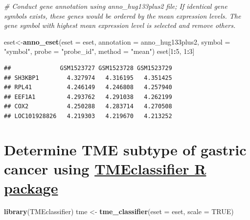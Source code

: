 \documentclass[
  12pt,
]{book}
\newenvironment{Shaded}{\begin{snugshade}}{\end{snugshade}}
\newcommand{\AttributeTok}[1]{\textcolor[rgb]{0.13,0.29,0.53}{#1}}
\newcommand{\CommentTok}[1]{\textcolor[rgb]{0.56,0.35,0.01}{\textit{#1}}}
\newcommand{\ConstantTok}[1]{\textcolor[rgb]{0.56,0.35,0.01}{#1}}
\newcommand{\DecValTok}[1]{\textcolor[rgb]{0.00,0.00,0.81}{#1}}
\newcommand{\FunctionTok}[1]{\textcolor[rgb]{0.13,0.29,0.53}{\textbf{#1}}}
\newcommand{\NormalTok}[1]{#1}
\newcommand{\OtherTok}[1]{\textcolor[rgb]{0.56,0.35,0.01}{#1}}
\newcommand{\SpecialCharTok}[1]{\textcolor[rgb]{0.81,0.36,0.00}{\textbf{#1}}}
\newcommand{\StringTok}[1]{\textcolor[rgb]{0.31,0.60,0.02}{#1}}
\begin{document}
\begin{Shaded}
\begin{Highlighting}[]
\CommentTok{\# Conduct gene annotation using \textasciigrave{}anno\_hug133plus2\textasciigrave{} file; If identical gene symbols exists, these genes would be ordered by the mean expression levels. The gene symbol with highest mean expression level is selected and remove others. }

\NormalTok{eset}\OtherTok{\textless{}{-}}\FunctionTok{anno\_eset}\NormalTok{(}\AttributeTok{eset       =}\NormalTok{ eset,}
                \AttributeTok{annotation =}\NormalTok{ anno\_hug133plus2,}
                \AttributeTok{symbol     =} \StringTok{"symbol"}\NormalTok{,}
                \AttributeTok{probe      =} \StringTok{"probe\_id"}\NormalTok{,}
                \AttributeTok{method     =} \StringTok{"mean"}\NormalTok{)}
\NormalTok{eset[}\DecValTok{1}\SpecialCharTok{:}\DecValTok{5}\NormalTok{, }\DecValTok{1}\SpecialCharTok{:}\DecValTok{3}\NormalTok{]}
\end{Highlighting}
\end{Shaded}

\begin{verbatim}
##              GSM1523727 GSM1523728 GSM1523729
## SH3KBP1        4.327974   4.316195   4.351425
## RPL41          4.246149   4.246808   4.257940
## EEF1A1         4.293762   4.291038   4.262199
## COX2           4.250288   4.283714   4.270508
## LOC101928826   4.219303   4.219670   4.213252
\end{verbatim}

\hypertarget{determine-tme-subtype-of-gastric-cancer-using-tmeclassifier-r-package}{%
\section{\texorpdfstring{Determine TME subtype of gastric cancer using \href{https://github.com/LiaoWJLab/TMEclassifier}{TMEclassifier R package}}{Determine TME subtype of gastric cancer using TMEclassifier R package}}\label{determine-tme-subtype-of-gastric-cancer-using-tmeclassifier-r-package}}

\begin{Shaded}
\begin{Highlighting}[]
\FunctionTok{library}\NormalTok{(TMEclassifier)}
\NormalTok{tme }\OtherTok{\textless{}{-}} \FunctionTok{tme\_classifier}\NormalTok{(}\AttributeTok{eset =}\NormalTok{ eset, }\AttributeTok{scale =} \ConstantTok{TRUE}\NormalTok{)}
\end{Highlighting}
\end{Shaded}
\end{document}
